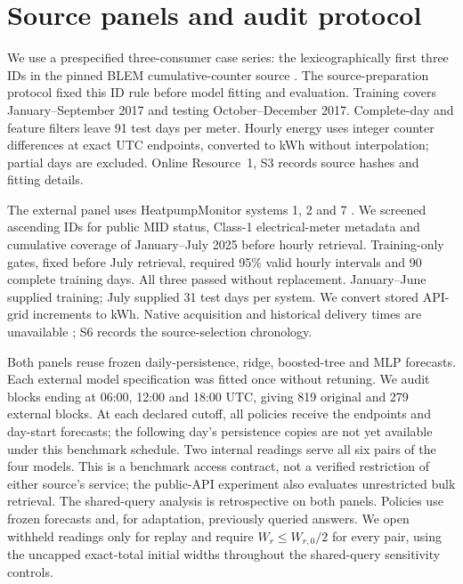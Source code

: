 \section{Source panels and audit protocol}
\label{sec:joint-protocol-summary}
We use a prespecified three-consumer case series: the lexicographically first
three IDs in the pinned BLEM cumulative-counter source \citep{blem}. The
source-preparation protocol fixed this ID rule before model fitting and
evaluation. Training covers January--September
2017 and testing October--December 2017. Complete-day and feature filters
leave 91 test days per meter. Hourly energy uses integer counter differences
at exact UTC endpoints, converted to kWh without interpolation; partial days
are excluded. Online Resource~1, S3 records source hashes and fitting details.

The external panel uses HeatpumpMonitor systems 1, 2 and 7
\citep{hpmabout,hpmapi}. We screened ascending IDs for public MID
status, Class-1 electrical-meter metadata and cumulative coverage of
January--July 2025 before hourly retrieval. Training-only gates, fixed
before July retrieval, required 95\% valid hourly intervals
and 90 complete training days. All three passed without replacement.
January--June supplied training; July supplied 31 test days per system.
We convert stored API-grid increments to kWh. Native acquisition and
historical delivery times are unavailable \citep{hpmcode}; S6 records the
source-selection chronology.

Both panels reuse frozen daily-persistence, ridge, boosted-tree and MLP
forecasts. Each external model specification was fitted once without
retuning. We audit blocks ending at 06:00, 12:00 and 18:00 UTC, giving
819 original and 279 external blocks. At each declared cutoff, all policies
receive the endpoints and day-start forecasts; the following day's
persistence copies are not yet available under this benchmark schedule.
Two internal readings serve all six pairs of the four models. This is a
benchmark access contract, not a verified restriction of either source's service;
the public-API experiment also evaluates unrestricted bulk retrieval.
The shared-query analysis is retrospective on both panels. Policies use
frozen forecasts and, for adaptation, previously queried answers. We open
withheld readings only for replay and require $W_r\leq W_{r,0}/2$ for every pair, using the
uncapped exact-total initial widths throughout the shared-query sensitivity controls.
